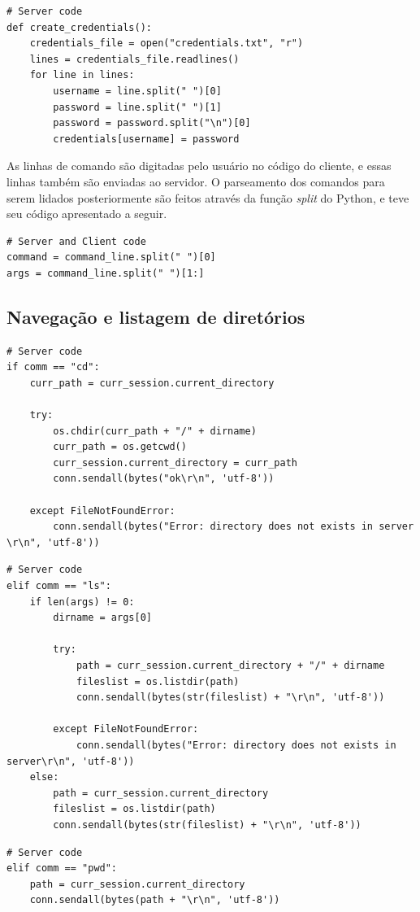 \documentclass[conference]{IEEEtran}
\begin{document}
\begin{lstlisting}
# Server code
def create_credentials():
	credentials_file = open("credentials.txt", "r")
	lines = credentials_file.readlines()
	for line in lines:
		username = line.split(" ")[0]
		password = line.split(" ")[1]
		password = password.split("\n")[0]
		credentials[username] = password
\end{lstlisting}

As linhas de comando são digitadas pelo usuário no código do cliente, e essas linhas também são enviadas ao servidor. O parseamento dos comandos para serem lidados posteriormente são feitos através da função \textit{split} do Python, e teve seu código apresentado a seguir. 

\begin{lstlisting}
# Server and Client code
command = command_line.split(" ")[0]
args = command_line.split(" ")[1:]
\end{lstlisting}

\subsection{Navegação e listagem de diretórios}

\begin{lstlisting}
# Server code
if comm == "cd":
	curr_path = curr_session.current_directory

	try:
	    os.chdir(curr_path + "/" + dirname)
	    curr_path = os.getcwd()
	    curr_session.current_directory = curr_path
	    conn.sendall(bytes("ok\r\n", 'utf-8'))

	except FileNotFoundError:
	    conn.sendall(bytes("Error: directory does not exists in server \r\n", 'utf-8'))
\end{lstlisting}

\begin{lstlisting}
# Server code
elif comm == "ls":
	if len(args) != 0:
	    dirname = args[0]
	    
	    try:
	    	path = curr_session.current_directory + "/" + dirname
	    	fileslist = os.listdir(path)
			conn.sendall(bytes(str(fileslist) + "\r\n", 'utf-8'))

	    except FileNotFoundError:
			conn.sendall(bytes("Error: directory does not exists in server\r\n", 'utf-8'))
	else:
		path = curr_session.current_directory
		fileslist = os.listdir(path)
	    conn.sendall(bytes(str(fileslist) + "\r\n", 'utf-8'))
\end{lstlisting}

\begin{lstlisting}
# Server code
elif comm == "pwd":
	path = curr_session.current_directory
	conn.sendall(bytes(path + "\r\n", 'utf-8'))
\end{lstlisting}
\end{document}
